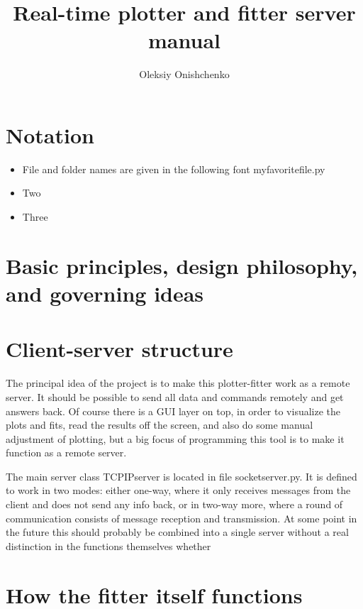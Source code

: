 \documentclass[11pt]{article} %
\title{Real-time plotter and fitter server manual}
\author{Oleksiy Onishchenko}
\begin{document}
\maketitle

\section{Notation}

\begin{itemize}
	\item File and folder names are given in the following font { myfavoritefile.py} 
	\item Two
	\item Three
\end{itemize}

\section{Basic principles, design philosophy, and governing ideas}

\section{Client-server structure}

The principal idea of the project is to make this plotter-fitter work as a remote server. It should be possible to send all data and commands remotely and get answers back. Of course there is a GUI layer on top, in order to visualize the plots and fits, read the results off the screen, and also do some manual adjustment of plotting, but a big focus of programming this tool is to make it function as a remote server.

The main server class { TCPIPserver} is located in file { socketserver.py}. It is defined to work in two modes: either one-way, where it only receives messages from the client and does not send any info back, or in two-way more, where a round of communication consists of message reception and transmission. { At some point in the future this should probably be combined into a single server without a real distinction in the functions themselves whether }

\section{How the fitter itself functions}
\end{document}
